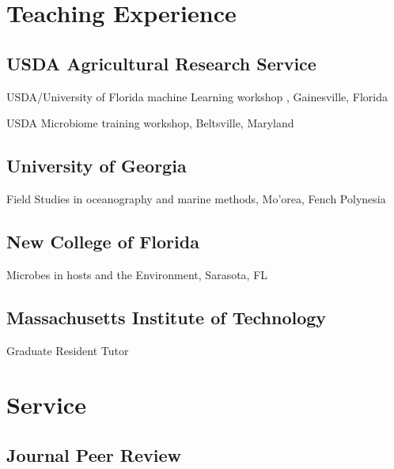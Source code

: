 \documentclass[12pt,letterpaper]{report}
\newcommand{\listitemspace}{0.15em}
\renewenvironment{itemize}
{\begin{list}{}{\setlength{\leftmargin}{0em}
            \setlength{\parskip}{0em}
            \setlength{\itemsep}{\listitemspace}
            \setlength{\parsep}{\listitemspace}}}
    {\end{list}}
\begin{document}
    \section*{Teaching Experience}

    \subsection*{USDA Agricultural Research Service}  
    \begin{itemize} 	
    	\item USDA/University of Florida machine Learning workshop , Gainesville, Florida
    	\item USDA Microbiome training workshop, Beltsville, Maryland
	\end{itemize}
    	
    \subsection*{University of Georgia}
        \begin{itemize}
    	\item Field Studies in oceanography and marine methods, Mo'orea, Fench Polynesia
	\end{itemize}

    \subsection*{New College of Florida}
            \begin{itemize}
    	\item Microbes in hosts and the Environment, Sarasota, FL
	\end{itemize}

    \subsection*{Massachusetts Institute of Technology}
            \begin{itemize}
    	\item Graduate Resident Tutor
	\end{itemize}


    \section*{Service}

    \subsection*{Journal Peer Review}
\end{document}

